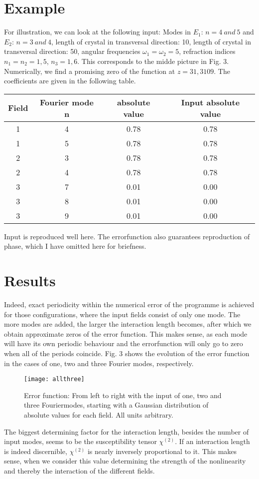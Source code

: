 \documentclass{article}
\begin{document}
\section{Example}
For illustration, we can look at the following input: Modes in $E_1$: $n=4 \ and \ 5$ and $E_2$: $n=3\ and \ 4$, length of crystal in transversal direction: 10, length of crystal in transversal direction: 50, angular frequencies $\omega_1=\omega_2=5$, refraction indices $n_1=n_2=1,5$, $n_3=1,6$. This corresponds to the midde picture in Fig. 3. Numerically, we find a promising zero of the function at $z=31,3109$. The coefficients are given in the following table.
\begin{center}
 \begin{tabular}{||c c c c||} 
 \hline
Field & Fourier mode n & absolute value & Input absolute value \\ [0.5ex] 
 \hline\hline
 1 & 4 & 0.78 &  0.78 \\ 
 \hline
 1 & 5 & 0.78 &  0.78 \\
 \hline
 2 & 3 & 0.78 &  0.78 \\
 \hline
 2 & 4 & 0.78 &  0.78 \\
 \hline
 3 & 7 & 0.01 &  0.00 \\
 \hline
 3 & 8 & 0.01 &  0.00 \\
 \hline
 3 & 9 & 0.01 &  0.00 \\ [1ex] 
 \hline
\end{tabular}
\end{center}
Input is reproduced well here. The errorfunction also guarantees reproduction of phase, which I have omitted here for briefness.
\section{Results}
Indeed, exact periodicity within the numerical error of the programme is achieved for those configurations, where the input fields consist of only one mode. The more modes are added, the larger the interaction length becomes, after which we obtain approximate zeros of the error function. This makes sense, as each mode will have its own periodic behaviour and the errorfunction will only go to zero when all of the periods coincide. Fig. 3 shows the evolution of the error function in the cases of one, two and three Fourier modes, respectively.
\begin{figure}[h]
\texttt{[image: allthree]}
\caption{Error function: From left to right with the input of one, two and three Fouriermodes, starting with a Gaussian distribution of absolute values for each field. All units arbitrary.}
\end{figure}
The biggest determining factor for the interaction length, besides the number of input modes, seems to be the susceptibility tensor $\chi^{(2)}$. If an interaction length is indeed discernible, $\chi^{(2)}$ is nearly inversely proportional to it. This makes sense, when we consider this value determining the strength of the nonlinearity and thereby the interaction of the different fields.
\end{document}
